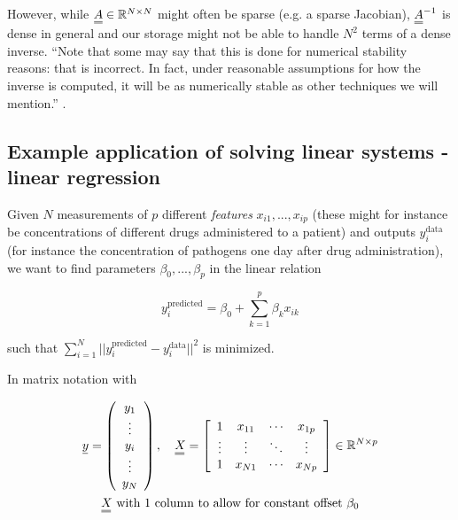 However, while $\mat{A} \in \mathbb{R}^{N\times N}$ 
might often be sparse (e.g. a sparse Jacobian), $\mat{A}^{-1}$ is 
dense in general and our storage might not be able to handle $N^2$ 
terms of a dense inverse. \enquote{Note that some may say that this is done 
for numerical stability reasons: that is incorrect. In fact, 
under reasonable assumptions for how the inverse is computed,
it will be as numerically stable as other 
techniques we will mention.} \citep[Ch. 6]{rackauckas22}.

\subsection{Example application of solving linear systems - linear regression}
\label{sec:linear_regression}

Given $N$ measurements of $p$ different \textit{features} $x_{i1},...,x_{ip}$ (these might for
instance be concentrations of different drugs administered to a patient) and outputs $y_i^{\text{data}}$ 
(for instance the concentration of pathogens one day after drug administration), we want
to find parameters $\beta_0,...,\beta_p$ in the linear relation

\begin{equation}
    y_i^{\text{predicted}} = \beta_0 + \sum_{k=1}^{p} \beta_k x_{ik}
\end{equation}

such that $\sum_{i=1}^{N} ||y_i^{\text{predicted}} - y_i^{\text{data}}||^2$ is minimized.

In matrix notation with

\begin{equation}
 \begin{gathered}
    \vec{y}=\left(\begin{array}{c}
        y_1 \\
        \vdots \\
        y_i \\
        \vdots \\
        y_N
        \end{array}\right), \quad \mat{X}=\left[\begin{array}{cccc}
        1 & x_{11} & \cdots & x_{1 p} \\
        \vdots & \vdots & \ddots & \vdots \\
        1 & x_{N 1} & \cdots & x_{N p}
    \end{array}\right] \in \mathbb{R}^{N \times p} \\
    \mat{X} \text{ with 1 column to allow for constant offset } \beta_0
 \end{gathered}
\end{equation}

